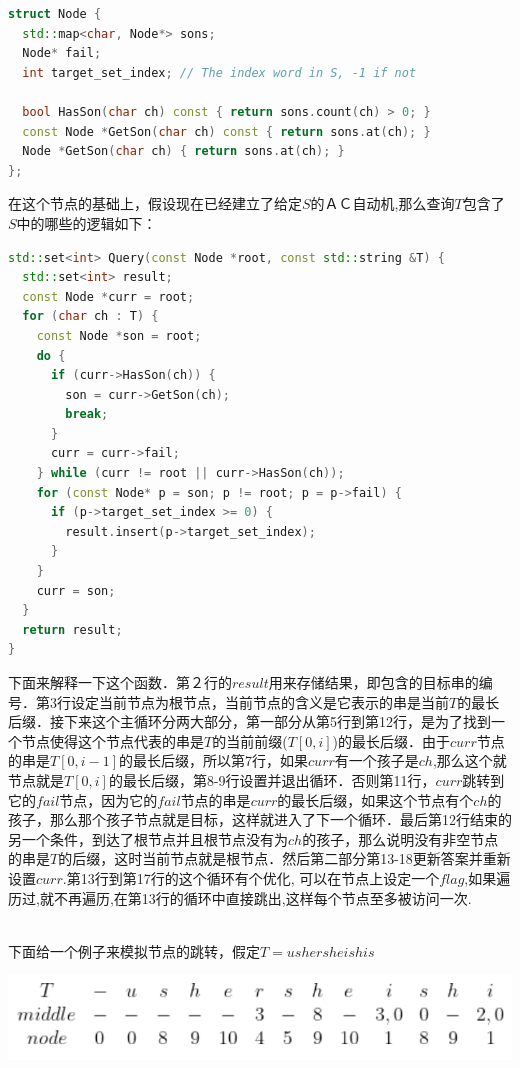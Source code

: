 \documentclass{article}
\begin{document}
\begin{lstlisting}[language=C++, caption={Node defination}]
struct Node {
  std::map<char, Node*> sons;
  Node* fail;
  int target_set_index; // The index word in S, -1 if not

  bool HasSon(char ch) const { return sons.count(ch) > 0; }
  const Node *GetSon(char ch) const { return sons.at(ch); }
  Node *GetSon(char ch) { return sons.at(ch); }
};
\end{lstlisting}

在这个节点的基础上，假设现在已经建立了给定$S$的ＡＣ自动机,那么查询$T$包含了$S$中的哪些的逻辑如下：　\par

\begin{lstlisting}[language=C++, caption={Query}]
std::set<int> Query(const Node *root, const std::string &T) {
  std::set<int> result;
  const Node *curr = root;
  for (char ch : T) {
    const Node *son = root;
    do {
      if (curr->HasSon(ch)) {
        son = curr->GetSon(ch);
        break;
      }
      curr = curr->fail;
    } while (curr != root || curr->HasSon(ch));
    for (const Node* p = son; p != root; p = p->fail) {
      if (p->target_set_index >= 0) {
        result.insert(p->target_set_index);
      }
    }
    curr = son;
  }
  return result;
}
\end{lstlisting}
下面来解释一下这个函数．第２行的$result$用来存储结果，即包含的目标串的编号．第3行设定当前节点为根节点，当前节点的含义是它表示的串是当前$T$的最长后缀．接下来这个主循环分两大部分，第一部分从第5行到第12行，是为了找到一个节点使得这个节点代表的串是$T$的当前前缀($T[0,i]$)的最长后缀．由于$curr$节点的串是$T[0,i-1]$的最长后缀，所以第7行，如果$curr$有一个孩子是$ch$,那么这个就节点就是$T[0,i]$的最长后缀，第8-9行设置并退出循环．否则第11行，$curr$跳转到它的$fail$节点，因为它的$fail$节点的串是$curr$的最长后缀，如果这个节点有个$ch$的孩子，那么那个孩子节点就是目标，这样就进入了下一个循环．最后第12行结束的另一个条件，到达了根节点并且根节点没有为$ch$的孩子，那么说明没有非空节点的串是$T$的后缀，这时当前节点就是根节点．然后第二部分第13-18更新答案并重新设置$curr$.第13行到第17行的这个循环有个优化, 可以在节点上设定一个$flag$,如果遍历过,就不再遍历,在第13行的循环中直接跳出,这样每个节点至多被访问一次.　\par
~\\
下面给一个例子来模拟节点的跳转，假定$T=ushersheishis$ \par
\includegraphics[scale=0.5]{pic4.png} \par
\end{document}

